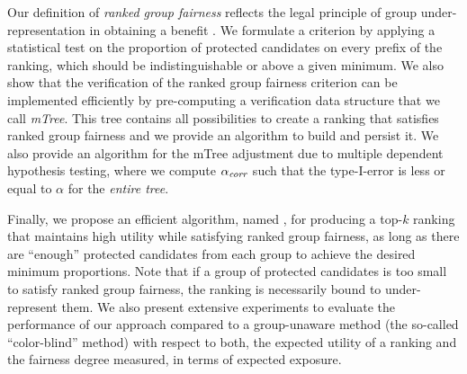 Our definition of \emph{ranked group fairness} reflects the legal principle of group under-representation in obtaining a benefit \cite{ellis2012eu,lerner2003group}.
%
%
%
We formulate a criterion by applying a statistical test on the proportion of protected candidates on every prefix of the ranking, which should be indistinguishable or above a given minimum.
%
%
We also show that the verification of the ranked group fairness criterion can be implemented efficiently by pre-computing a verification data structure that we call \emph{mTree}.
%
This tree contains all possibilities to create a ranking that satisfies ranked group fairness and we provide an algorithm to build and persist it.
%
We also provide an algorithm \algoCorrect for the mTree adjustment due to multiple dependent hypothesis testing, where we compute $\alpha_\textit{corr}$ such that the type-I-error is less or equal to $\alpha$ for the \emph{entire tree}.
%

Finally, we propose an efficient algorithm, named \algoFAIR, for producing a top-$k$ ranking that maintains high utility while satisfying ranked group fairness, as long as there are ``enough'' protected candidates from each group to achieve the desired minimum proportions.
%
Note that if a group of protected candidates is too small to satisfy ranked group fairness, the ranking is necessarily bound to under-represent them.
%
We also present extensive experiments to evaluate the performance of our approach compared to a group-unaware method (the so-called ``color-blind'' method) with respect to both, the expected utility of a ranking and the fairness degree measured, in terms of expected exposure.

